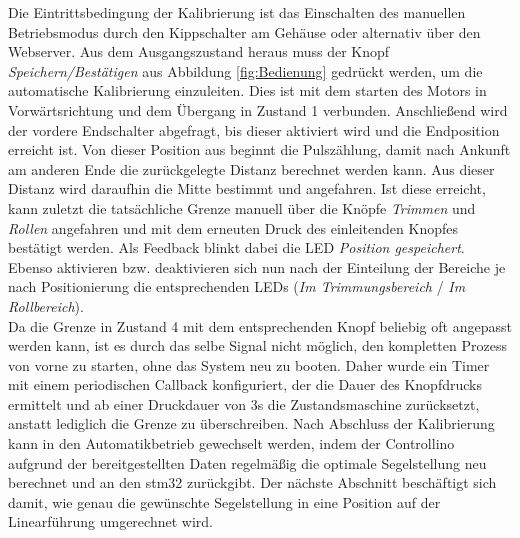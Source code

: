 \noindent
Die Eintrittsbedingung der Kalibrierung ist das Einschalten des manuellen Betriebsmodus durch den Kippschalter am Gehäuse oder alternativ über den Webserver. Aus dem Ausgangszustand heraus muss der Knopf \textit{Speichern/Bestätigen} aus Abbildung \ref{fig:Bedienung} gedrückt werden, um die automatische Kalibrierung einzuleiten. Dies ist mit dem starten des Motors in Vorwärtsrichtung und dem Übergang in Zustand 1 verbunden. Anschließend wird der vordere Endschalter abgefragt, bis dieser aktiviert wird und die Endposition erreicht ist. Von dieser Position aus beginnt die Pulszählung, damit nach Ankunft am anderen Ende die zurückgelegte Distanz berechnet werden kann. Aus dieser Distanz wird daraufhin die Mitte bestimmt und angefahren. Ist diese erreicht, kann zuletzt die tatsächliche Grenze manuell über die Knöpfe \textit{Trimmen} und \textit{Rollen} angefahren und mit dem erneuten Druck des einleitenden Knopfes bestätigt werden. Als Feedback blinkt dabei die LED \textit{Position gespeichert}. Ebenso aktivieren bzw. deaktivieren sich nun nach der Einteilung der Bereiche je nach Positionierung die entsprechenden LEDs (\textit{Im Trimmungsbereich} / \textit{Im Rollbereich}).\\

\noindent
Da die Grenze in Zustand 4 mit dem entsprechenden Knopf beliebig oft angepasst werden kann, ist es durch das selbe Signal nicht möglich, den kompletten Prozess von vorne zu starten, ohne das System neu zu booten. Daher wurde ein Timer mit einem periodischen Callback konfiguriert, der die Dauer des Knopfdrucks ermittelt und ab einer Druckdauer von 3s die Zustandsmaschine zurücksetzt, anstatt lediglich die Grenze zu überschreiben. Nach Abschluss der Kalibrierung kann in den Automatikbetrieb gewechselt werden, indem der Controllino aufgrund der bereitgestellten Daten regelmäßig die optimale Segelstellung neu berechnet und an den stm32 zurückgibt. Der nächste Abschnitt beschäftigt sich damit, wie genau die gewünschte Segelstellung in eine Position auf der Linearführung umgerechnet wird. 
